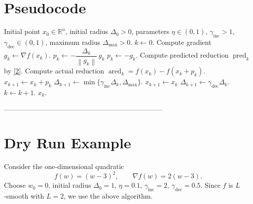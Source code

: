 \documentclass{article}
\newcommand{\norm}[1]{\left\lVert#1\right\rVert}
\newcommand{\R}{\mathbb{R}}
\begin{document}
\section*{Pseudocode}
\begin{algorithm}[H]
\caption{Trust‑Region Gradient Method (TR‑GM)}
\begin{algorithmic}[1]
\Require Initial point $x_{0}\in\R^{n}$, initial radius $\Delta_{0}>0$, 
parameters $\eta\in(0,1)$, $\gamma_{\text{inc}}>1$, $\gamma_{\text{dec}}\in(0,1)$,
maximum radius $\Delta_{\max}>0$.
\State $k\gets0$.
    \State Compute gradient $g_{k}\gets\nabla f(x_{k})$.
    \If{$\norm{g_{k}}>\Delta_{k}$}
        \State $p_{k}\gets -\dfrac{\Delta_{k}}{\norm{g_{k}}}\,g_{k}$ 
    \Else
        \State $p_{k}\gets -g_{k}$.
    \EndIf
    \State Compute predicted reduction $\operatorname{pred}_{k}$ by \eqref{2}.
    \State Compute actual reduction $\operatorname{ared}_{k}=f(x_{k})-f(x_{k}+p_{k})$.
        \State $x_{k+1}\gets x_{k}+p_{k}$ 
        \State $\Delta_{k+1}\gets\min\{\gamma_{\text{inc}}\Delta_{k},\Delta_{\max}\}$.
    \Else
        \State $x_{k+1}\gets x_{k}$ 
        \State $\Delta_{k+1}\gets\gamma_{\text{dec}}\Delta_{k}$.
    \EndIf
    \State $k\gets k+1$.
\EndWhile
\State \Return $x_{k}$.
\end{algorithmic}
\end{algorithm}

---------------------------------------------------------------------

\section*{Dry Run Example}
Consider the one‑dimensional quadratic
\[
f(w)=(w-3)^{2},\qquad \nabla f(w)=2(w-3).
\]
Choose $w_{0}=0$, initial radius $\Delta_{0}=1$, $\eta=0.1$, $\gamma_{\text{inc}}=2$, $\gamma_{\text{dec}}=0.5$.
Since $f$ is $L$‑smooth with $L=2$, we use the above algorithm.
\end{document}
